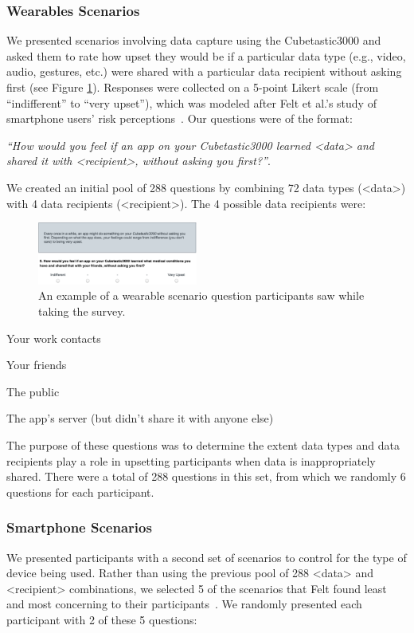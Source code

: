 \subsubsection{Wearables Scenarios}
We presented scenarios involving data capture using the Cubetastic3000 and asked them to rate how upset they would be if a particular data type (e.g., video, audio, gestures, etc.) were shared with a particular data recipient without asking first (see Figure \ref{fig:prompt}). Responses were collected on a 5-point Likert scale (from ``indifferent'' to ``very upset''), which was modeled after Felt et al.'s study of smartphone users' risk perceptions~\cite{Felt}. Our questions were of the format: 

\textit{``How would you feel if an app on your Cubetastic3000 learned <data> and shared it with <recipient>, without asking you first?''}. 

We created an initial pool of 288 questions by combining 72 data types (<data>) with 4 data recipients (<recipient>). The 4 possible data recipients were: \\[-.8cm]

\begin{figure}[t]
	\centering
	\includegraphics[width=0.47\textwidth]{images/prompt.pdf}
	\caption{An example of a wearable scenario question participants saw while taking the survey.}
	\label{fig:prompt}
\end{figure}

\begin{packed_item}
\item Your work contacts
\item Your friends
\item The public
\item The app's server (but didn't share it with anyone else)\\[-.8cm]
\end{packed_item}

The purpose of these questions was to determine the extent data types and data recipients play a role in upsetting participants when data is inappropriately shared. There were a total of 288 questions in this set, from which we randomly 6 questions for each participant.

\subsubsection{Smartphone Scenarios}
\label{sec:smartphones}
We presented participants with a second set of scenarios to control for the type of device being used. Rather than using the previous pool of 288 <data> and <recipient> combinations, we selected 5 of the scenarios that Felt \etal found least and most concerning to their participants~\cite{Felt}. We randomly presented each participant with 2 of these 5 questions: 

